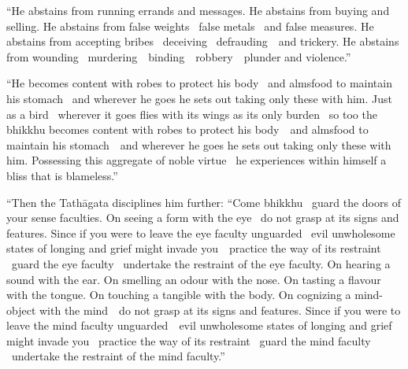 \begin{english-only-justify}
  ``He abstains from running errands and messages. He abstains from buying and selling. He abstains from false weights \breathmark\ false metals \breathmark\ and false measures. He abstains from accepting bribes \breathmark\ deceiving \breathmark\ \mbox{defrauding}~\breathmark\ and trickery. He abstains from wounding \breathmark\ \mbox{murdering}~\breathmark\ \mbox{binding}~\breathmark\ \mbox{robbery}~\breathmark\ plunder and violence.''
\end{english-only-justify}

\begin{english-only-justify}
  ``He becomes content with robes to protect his body \breathmark\ and almsfood to maintain his stomach \breathmark\ and wherever he goes he sets out taking only these with him. Just as a bird \breathmark\ wherever it goes flies with its wings as its only burden \breathmark\ so too the bhikkhu becomes content with robes to protect his \mbox{body}~\breathmark\ and almsfood to maintain his \mbox{stomach}~\breathmark\ and wherever he goes he sets out taking only these with him. Possessing this aggregate of noble virtue \breathmark\ he experiences within himself a bliss that is blameless.''
\end{english-only-justify}

\suttaRef{[MN 51]}

\begin{english-only-justify}
  ``Then the Tathāgata disciplines him further: ``Come bhikkhu \breathmark\ guard the doors of your sense faculties. On seeing a form with the eye \breathmark\ do not grasp at its signs and features. Since if you were to leave the eye faculty unguarded \breathmark\ evil unwholesome states of longing and grief might invade \mbox{you}~\breathmark\ practice the way of its restraint \breathmark\ guard the eye faculty \breathmark\ undertake the restraint of the eye faculty. On hearing a sound with the ear. On smelling an odour with the nose. On tasting a flavour with the tongue. On touching a tangible with the body. On cognizing a mind-object with the \mbox{mind}~\breathmark\ do not grasp at its signs and features. Since if you were to leave the mind faculty \mbox{unguarded}~\breathmark\ evil unwholesome states of longing and grief might invade you \breathmark\ practice the way of its restraint \breathmark\ guard the mind faculty \breathmark\ undertake the restraint of the mind faculty.''
\end{english-only-justify}

